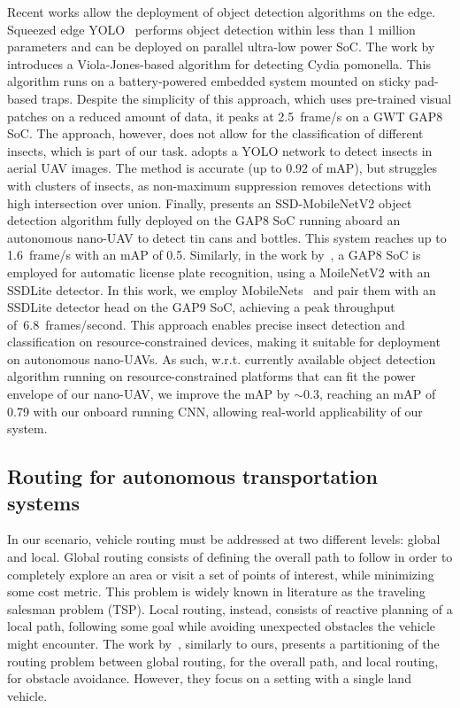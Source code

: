 Recent works allow the deployment of object detection algorithms on the edge.
Squeezed edge YOLO~\citep{humes2023squeezed} performs object detection within less than 1 million parameters and can be deployed on parallel ultra-low power SoC.
The work by~\citet{rusci2023parallel} introduces a Viola-Jones-based algorithm for detecting Cydia pomonella.
This algorithm runs on a battery-powered embedded system mounted on sticky pad-based traps.
Despite the simplicity of this approach, which uses pre-trained visual patches on a reduced amount of data, it peaks at \SI{2.5}{frame/\second} on a GWT GAP8 SoC. 
The approach, however, does not allow for the classification of different insects, which is part of our task.
\citet{BETTISORBELLI2023108228} adopts a YOLO network to detect insects in aerial UAV images. 
The method is accurate (up to 0.92 of mAP), but struggles with clusters of insects, as non-maximum suppression removes detections with high intersection over union.
Finally, \citet{10137154} presents an SSD-MobileNetV2 object detection algorithm fully deployed on the GAP8 SoC running aboard an autonomous nano-UAV to detect tin cans and bottles.
This system reaches up to \SI{1.6}{frame/\second} with an mAP of 0.5.
Similarly, in the work by~\citet{9401730}, a GAP8 SoC is employed for automatic license plate recognition, using a MoileNetV2 with an SSDLite detector.
In this work, we employ MobileNets~\cite{howard2017mobilenets} and pair them with an SSDLite detector head on the GAP9 SoC, achieving a peak throughput of~\SI{6.8}{frames/second}. 
This approach enables precise insect detection and classification on resource-constrained devices, making it suitable for deployment on autonomous nano-UAVs.
As such, w.r.t. currently available object detection algorithm running on resource-constrained platforms that can fit the power envelope of our nano-UAV, we improve the mAP by $\sim$0.3, reaching an mAP of 0.79 with our onboard running CNN, allowing real-world applicability of our system.

\subsection{Routing for autonomous transportation systems}

In our scenario, vehicle routing must be addressed at two different levels: global and local.  
Global routing consists of defining the overall path to follow in order to completely explore an area or visit a set of points of interest, while minimizing some cost metric. 
This problem is widely known in literature as the traveling salesman problem (TSP).  
Local routing, instead, consists of reactive planning of a local path, following some goal while avoiding unexpected obstacles the vehicle might encounter.  
The work by~\citet{marin2018global}, similarly to ours, presents a partitioning of the routing problem between global routing, for the overall path, and local routing, for obstacle avoidance. 
However, they focus on a setting with a single land vehicle.

